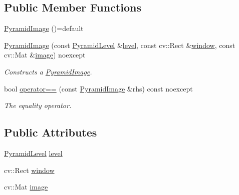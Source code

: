 \subsection*{Public Member Functions}
\begin{DoxyCompactItemize}
\item 
\hyperlink{structdg_1_1deepcore_1_1imagery_1_1_pyramid_image_ad022f3ffdd9ca5a220484081042d3e5b}{Pyramid\+Image} ()=default
\item 
\hyperlink{group___imagery_module_gaf984c16fb13cf715c6948a5754e49030}{Pyramid\+Image} (const \hyperlink{structdg_1_1deepcore_1_1imagery_1_1_pyramid_level}{Pyramid\+Level} \&\hyperlink{structdg_1_1deepcore_1_1imagery_1_1_pyramid_image_a7b7af6e38ef1c12b18b005fcecd75095}{level}, const cv\+::\+Rect \&\hyperlink{structdg_1_1deepcore_1_1imagery_1_1_pyramid_image_a9870a21dfd1176d0fad87249839f9c91}{window}, const cv\+::\+Mat \&\hyperlink{structdg_1_1deepcore_1_1imagery_1_1_pyramid_image_abb62e5062adca1d33dc98be4b1cba056}{image}) noexcept
\begin{DoxyCompactList}\small\item\em Constructs a \hyperlink{structdg_1_1deepcore_1_1imagery_1_1_pyramid_image}{Pyramid\+Image}. \end{DoxyCompactList}\item 
bool \hyperlink{group___imagery_module_ga584d04224a994c7b1acef73a43fb531a}{operator==} (const \hyperlink{structdg_1_1deepcore_1_1imagery_1_1_pyramid_image}{Pyramid\+Image} \&rhs) const noexcept
\begin{DoxyCompactList}\small\item\em The equality operator. \end{DoxyCompactList}\end{DoxyCompactItemize}
\subsection*{Public Attributes}
\begin{DoxyCompactItemize}
\item 
\hyperlink{structdg_1_1deepcore_1_1imagery_1_1_pyramid_level}{Pyramid\+Level} \hyperlink{structdg_1_1deepcore_1_1imagery_1_1_pyramid_image_a7b7af6e38ef1c12b18b005fcecd75095}{level}
\item 
cv\+::\+Rect \hyperlink{structdg_1_1deepcore_1_1imagery_1_1_pyramid_image_a9870a21dfd1176d0fad87249839f9c91}{window}
\item 
cv\+::\+Mat \hyperlink{structdg_1_1deepcore_1_1imagery_1_1_pyramid_image_abb62e5062adca1d33dc98be4b1cba056}{image}
\end{DoxyCompactItemize}


